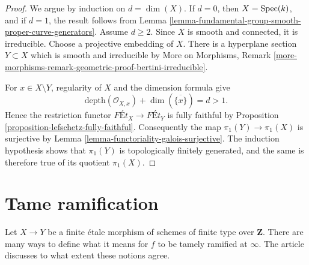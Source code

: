 \begin{proof}
We argue by induction on $d = \dim(X)$. If $d = 0$, then $X = \mathop{\mathrm{Spec}}(k)$,
and if $d = 1$, the result follows from
Lemma \ref{lemma-fundamental-group-smooth-proper-curve-generators}.
Assume $d \geq 2$. Since $X$ is smooth and connected, it is irreducible.
Choose a projective embedding of $X$. There is a hyperplane section
$Y \subset X$ which is smooth and irreducible by More on Morphisms,
Remark \ref{more-morphisms-remark-geometric-proof-bertini-irreducible}.

For $x \in X \setminus Y$, regularity of $X$ and the dimension formula give
$$
\text{depth}(\mathcal{O}_{X, x}) + \dim(\overline{\{x\}}) = d > 1.
$$
Hence the restriction functor
$\textit{F\'Et}_X \to \textit{F\'Et}_Y$ is fully faithful by
Proposition \ref{proposition-lefschetz-fully-faithful}. Consequently the map
$\pi_1(Y) \to \pi_1(X)$ is surjective by
Lemma \ref{lemma-functoriality-galois-surjective}. The induction hypothesis
shows that $\pi_1(Y)$ is topologically finitely generated, and the same is
therefore true of its quotient $\pi_1(X)$.
\end{proof}













\section{Tame ramification}
\label{section-tame}

\noindent
Let $X \to Y$ be a finite \'etale morphism of schemes of finite type
over $\mathbf{Z}$. There are many ways to define what it means for $f$
to be tamely ramified at $\infty$. The article \cite{Kerz-Schmidt}
discusses to what extent these notions agree.

